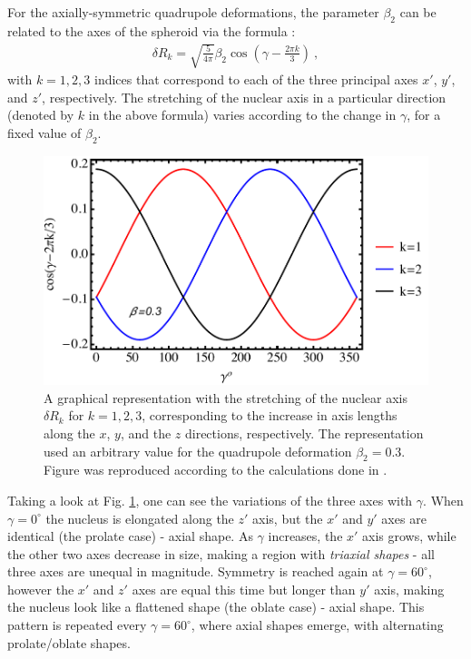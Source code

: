 For the axially-symmetric quadrupole deformations, the parameter $\beta_2$ can be related to the axes of the spheroid via the formula \cite{greiner1996nuclear}:
\begin{align}
    \delta R_k=\sqrt{\frac{5}{4\pi}}\beta_2\cos\left(\gamma-\frac{2\pi k}{3}\right)\ ,
    \label{axes-stretching}
\end{align}
with $k=1,2,3$ indices that correspond to each of the three principal axes $x'$, $y'$, and $z'$, respectively. The stretching of the nuclear axis in a particular direction (denoted by $k$ in the above formula) varies according to the change in $\gamma$, for a fixed value of $\beta_2$.

\begin{figure}
    \centering
    \includegraphics[scale=0.65]{Chapters/Figures/nuclear-radius-elongation.pdf}
    \caption{A graphical representation with the stretching of the nuclear axis $\delta R_k$ for $k=1,2,3$, corresponding to the increase in axis lengths along the $x$, $y$, and the $z$ directions, respectively. The representation used an arbitrary value for the quadrupole deformation $\beta_2=0.3$. Figure was reproduced according to the calculations done in \cite{greiner1996nuclear}.}
    \label{nuclear-radius-elongation}
\end{figure}

Taking a look at Fig. \ref{nuclear-radius-elongation}, one can see the variations of the three axes with $\gamma$. When $\gamma=0^\circ$ the nucleus is elongated along the $z'$ axis, but the $x'$ and $y'$ axes are identical (the prolate case) - axial shape. As $\gamma$ increases, the $x'$ axis grows, while the other two axes decrease in size, making a region with \emph{triaxial shapes} - all three axes are unequal in magnitude. Symmetry is reached again at $\gamma=60^\circ$, however the $x'$ and $z'$ axes are equal this time but longer than $y'$ axis, making the nucleus look like a flattened shape (the oblate case) - axial shape. This pattern is repeated every $\gamma=60^\circ$, where axial shapes emerge, with alternating prolate/oblate shapes.

